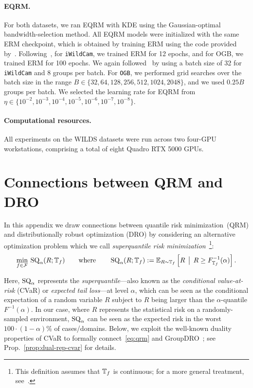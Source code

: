 \documentclass{article}
\begin{document}
\paragraph{EQRM.}  For both datasets, we ran EQRM with KDE using the Gaussian-optimal bandwidth-selection method.  All EQRM models were initialized with the same ERM checkpoint, which is obtained by training ERM using the code provided by~\cite{wilds2021}.  Following~\cite{wilds2021}, for \texttt{iWildCam}, we trained ERM for 12 epochs, and for OGB, we trained ERM for 100 epochs.  We again followed~\cite{wilds2021} by using a batch size of 32 for \texttt{iWildCam} and 8 groups per batch.  For \texttt{OGB}, we performed grid searches over the batch size in the range $B\in\{32, 64, 128, 256, 512, 1024, 2048\}$, and we used $0.25B$ groups per batch.  We selected the learning rate for EQRM from $\eta\in\{10^{-2}, 10^{-3}, 10^{-4}, 10^{-5}, 10^{-6}, 10^{-7}, 10^{-8}\}$.

%

\paragraph{Computational resources.} 
All experiments on the WILDS datasets were run across two four-GPU workstations, comprising a total of eight Quadro RTX 5000 GPUs.


\section{Connections between QRM and DRO}\label{app:dro}
In this appendix we draw connections between quantile risk minimization~(QRM) and distributionally robust optimization (DRO) by considering an alternative optimization problem which we call \textit{superquantile risk minimization}~\footnote{This definition assumes that $\mathbb{T}_f$ is continuous; for a more general treatment, see~\cite{rockafellar2000CVaR}.}:
%
\begin{align}\label{eq:sqrm_def}
    \min_{f\in\mathcal{F}} \: \operatorname{SQ}_\alpha(R; \mathbb{T}_f)
    \qquad \text{where} \qquad 
    \operatorname{SQ}_\alpha(R; \mathbb{T}_f) := \operatorname{\mathbb{E}}_{R\sim\mathbb{T}_f} \left[ R \:\: \big| \:\: R \geq F^{-1}_{\mathbb{T}_f}(\alpha) \right].
\end{align}

%
%
%
%
%
%
Here, $\operatorname{SQ}_{\alpha}$ represents the \textit{superquantile}---also known as the \textit{conditional value-at-risk} (CVaR) or \textit{expected tail loss}---at level $\alpha$, which
%
can be seen as the conditional expectation of a random variable $R$ subject to $R$ being larger than the $\alpha$-quantile
%
$F^{-1}(\alpha)$. In our case, where $R$ represents the statistical risk on a randomly-sampled environment, $\operatorname{SQ}_\alpha$ can be seen as the expected risk in the worst $100 \cdot (1-\alpha)$\% of cases/domains. Below, we exploit the well-known duality properties of CVaR to formally connect~\eqref{eq:qrm} and GroupDRO~\cite{sagawa2019distributionally}; see Prop.~\ref{prop:dual-rep-cvar} for details. 
\end{document}
